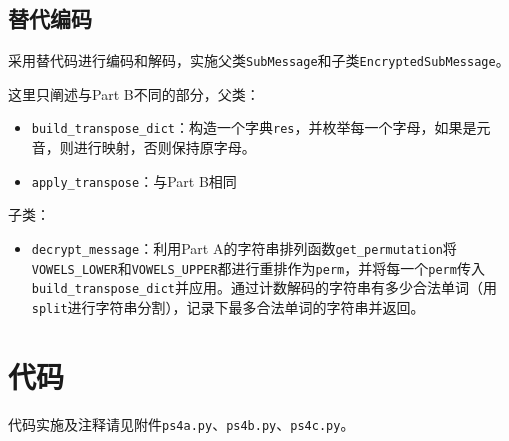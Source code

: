 \documentclass[logo,reportComp]{thesis}
\begin{document}
\subsection{替代编码}
采用替代码进行编码和解码，实施父类\verb'SubMessage'和子类\verb'EncryptedSubMessage'。

这里只阐述与Part B不同的部分，父类：
\begin{itemize}
	\item \verb'build_transpose_dict'：构造一个字典\verb'res'，并枚举每一个字母，如果是元音，则进行映射，否则保持原字母。
	\item \verb'apply_transpose'：与Part B相同
\end{itemize}

子类：
\begin{itemize}
	\item \verb'decrypt_message'：利用Part A的字符串排列函数\verb'get_permutation'将\verb'VOWELS_LOWER'和\verb'VOWELS_UPPER'都进行重排作为\verb'perm'，并将每一个\verb'perm'传入\verb'build_transpose_dict'并应用。通过计数解码的字符串有多少合法单词（用\verb'split'进行字符串分割），记录下最多合法单词的字符串并返回。
\end{itemize}

\section{代码}
代码实施及注释请见附件\verb'ps4a.py'、\verb'ps4b.py'、\verb'ps4c.py'。
\end{document}
